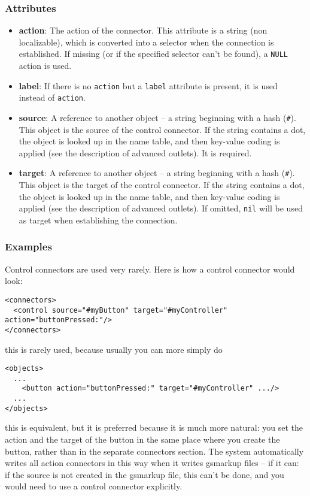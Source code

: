\subsubsection{Attributes}
\begin{itemize}
\item {\bf action}: The action of the connector.  This attribute is a string 
(non localizable), which is converted into a selector when the
connection is established.  If missing (or if the specified selector
can't be found), a \texttt{NULL} action is used.
\item {\bf label}: If there is no \texttt{action} but a \texttt{label} attribute
is present, it is used instead of \texttt{action}.
\item {\bf source}: A reference to another object -- a string beginning with
a hash (\texttt{\#}).  This object is the source of the control
connector.  If the string contains a dot, the object is looked up in
the name table, and then key-value coding is applied (see the
description of advanced outlets).  It is required.
\item {\bf target}: A reference to another object -- a string beginning with
a hash (\texttt{\#}).  This object is the target of the control
connector.  If the string contains a dot, the object is looked up in
the name table, and then key-value coding is applied (see the
description of advanced outlets).  If omitted, \texttt{nil} will be
used as target when establishing the connection.
\end{itemize}

\subsubsection{Examples}
Control connectors are used very rarely.  Here is how a control
connector would look:
\begin{verbatim}
<connectors>
  <control source="#myButton" target="#myController" action="buttonPressed:"/>
</connectors>
\end{verbatim}
this is rarely used, because usually you can more simply do
\begin{verbatim}
<objects>
  ...
    <button action="buttonPressed:" target="#myController" .../>
  ...
</objects>
\end{verbatim}
this is equivalent, but it is preferred because it is much more
natural: you set the action and the target of the button in the same
place where you create the button, rather than in the separate
connectors section.  The system automatically writes all action
connectors in this way when it writes gsmarkup files -- if it can: if the
source is not created in the gsmarkup file, this can't be done, and you
would need to use a control connector explicitly.

